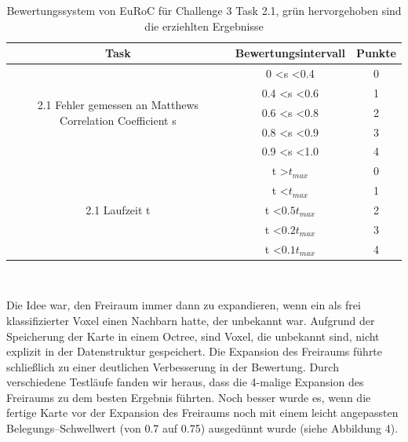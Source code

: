 \documentclass[12pt,titlepage, a4paper]{article}
\begin{document}
\begin{table}
\centering
\begin{tabular}{c|c|c}
Task & Bewertungsintervall & Punkte\\
\hline
\multirow{5}{210pt}{2.1 Fehler gemessen an Matthews Correlation Coefficient s} & 0 \textless s \textless 0.4 & 0 \\
 & 0.4 \textless  s \textless 0.6 & 1\\  
  & 0.6 \textless  s \textless 0.8 & 2\\
 & \cellcolor{green!10.0}0.8 \textless  s \textless 0.9 &\cellcolor{green!10.0} 3\\
 & 0.9 \textless  s \textless 1.0 & 4\\
\hline
\multirow{5}{210pt}{2.1 Laufzeit t} & t \textgreater $t_{max}$ & 0 \\
 & t \textless $t_{max}$ & 1\\  
  &\cellcolor{green!10.0} t \textless $0.5 t_{max}$ &\cellcolor{green!10.0} 2\\
  & t \textless $0.2 t_{max}$ & 3\\
 & t \textless $0.1 t_{max}$ & 4\\
\hline
\end{tabular}\\
\vspace{10mm}
\caption{Bewertungssystem von EuRoC für Challenge 3 Task 2.1, grün hervorgehoben sind die erziehlten Ergebnisse}
\label{table:scoringt2}
\end{table}

Die Idee war, den Freiraum immer dann zu expandieren, wenn ein als frei klassifizierter Voxel einen Nachbarn hatte, der unbekannt war. Aufgrund der Speicherung der Karte in einem Octree, sind Voxel, die unbekannt sind, nicht explizit in der Datenstruktur gespeichert. Die Expansion des Freiraums führte schließlich zu einer deutlichen Verbesserung in der Bewertung. Durch verschiedene Testläufe fanden wir heraus, dass die 4-malige Expansion des Freiraums zu dem besten Ergebnis führten. Noch besser wurde es, wenn die fertige Karte vor der Expansion des Freiraums noch mit einem leicht angepassten Belegungs--Schwellwert (von 0.7 auf 0.75) ausgedünnt wurde (siehe Abbildung 4). 
\end{document}
